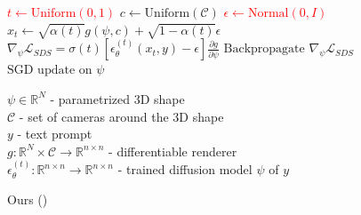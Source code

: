 \begin{figure}[h!]
\begin{minipage}{.5\textwidth}
\begin{algorithm}[H]
\begin{algorithmic}
                    \State \textcolor{Red}{$t  \gets \text{Uniform}(0, 1)$}  
                    \State $c \gets \text{Uniform}(\mathcal{C})$    
                    \State \textcolor{Red}{$\epsilon \gets \text{Normal}(0, I)$ }  
                    \State $x_t \gets \sqrt{\alpha(t)} g(\psi, c) + \sqrt{1 - \alpha(t)}\epsilon$   
                    \State $\nabla_\psi\mathcal{L}_{SDS} = \sigma(t) \left[\epsilon_\theta^{(t)}\left(x_t, y\right)  - \epsilon \right] \frac{\partial g}{\partial \psi}$   
                    \State $\text{Backpropagate } \nabla_\psi\mathcal{L}_{SDS}$
                    \State $\text{SGD update on } \psi$
                \EndFor
                \EndProcedure
            \end{algorithmic}
        \end{algorithm}
    \end{minipage}%
    \begin{minipage}{.5\textwidth}
        \centering
        \begin{algorithm}[H]
            \caption{Ours (\ourmethod)}\label{alg:suggested_algorithm}
            \begin{algorithmic}\footnotesize
                \Require
                    $\psi \in \mathbb{R}^N$ {- parametrized 3D shape} \\
                    $\mathcal{C}$ {- set of cameras around the 3D shape} \\
                    $y$ {- text prompt} \\
                    $g: \mathbb{R}^N \times \mathcal{C} \rightarrow \mathbb{R}^{n \times n}$ {- differentiable renderer} \\
                    $\epsilon_\theta^{(t)} : \mathbb{R}^{n \times n} \rightarrow \mathbb{R}^{n \times n}$ {- trained diffusion model}
                 $\psi$ {of} $y$


\end{algorithmic}
\end{algorithm}
\end{minipage}
\end{figure}
